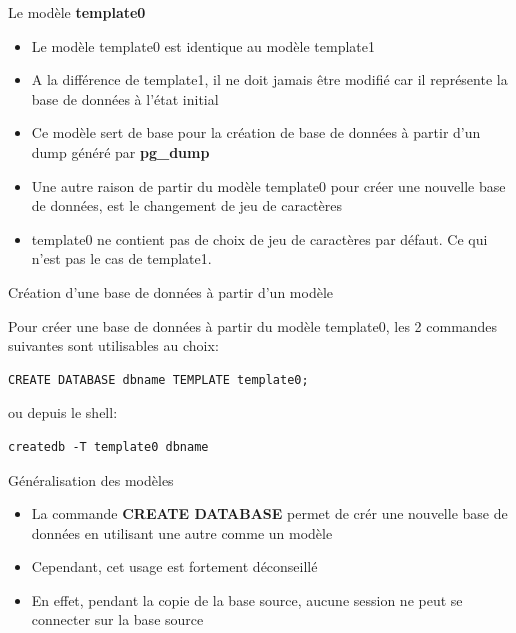 
\begin{frame}[fragile]{Le modèle \textbf{template0}}

\begin{itemize}
   \item Le modèle template0 est identique au modèle template1
   \item A la différence de template1, il ne doit jamais être modifié car il représente la base de données à l'état initial
   \item Ce modèle sert de base pour la création de base de données à partir d'un dump généré par \textbf{pg\_dump}
   \item Une autre raison de partir du modèle template0 pour créer une nouvelle base de données, est le changement de jeu de caractères
   \item template0 ne contient pas de choix de jeu de caractères par défaut. Ce qui n'est pas le cas de template1.
\end{itemize}

\end{frame}


\begin{frame}[fragile]{Création d'une base de données à partir d'un modèle}

   Pour créer une base de données à partir du modèle template0, les 2 commandes suivantes sont utilisables au choix:
\begin{tiny}
\begin{Verbatim}[commandchars=\\\{\}]
CREATE DATABASE dbname TEMPLATE template0;
\end{Verbatim}
\end{tiny}
ou depuis le shell:
\begin{tiny}
\begin{Verbatim}[commandchars=\\\{\}]
createdb -T template0 dbname
\end{Verbatim}
\end{tiny}


\end{frame}


\begin{frame}{Généralisation des modèles}

\begin{itemize}
   \item La commande \textbf{CREATE DATABASE} permet de crér une nouvelle base de données en utilisant une autre comme un modèle
   \item Cependant, cet usage est fortement déconseillé
   \item En effet, pendant la copie de la base source, aucune session ne peut se connecter sur la base source
\end{itemize}

\end{frame}

